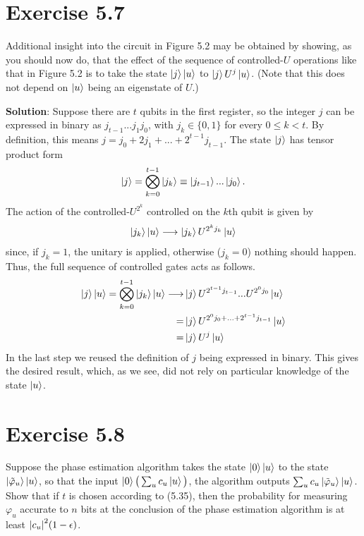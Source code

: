 \documentclass{book}
\begin{document}
\section*{Exercise 5.7}
    Additional insight into the circuit in Figure 5.2 may be obtained by showing, as you should now do, that the effect of the sequence of controlled-$U$ operations like that in Figure 5.2 is to take the state $\ket{j}\ket{u}$ to $\ket{j}U^j\ket{u}$. (Note that this does not depend on $\ket{u}$ being an eigenstate of $U$.)

    \textbf{Solution}: Suppose there are $t$ qubits in the first register, so the integer $j$ can be expressed in binary as $j_{t-1}...j_1j_0$, with $j_k \in \{0,1\}$ for every $0\leq k < t$. By definition, this means $j = j_0 + 2j_1 + ... + 2^{t-1}j_{t-1}$. The state $\ket{j}$ has tensor product form
    \begin{align}
        \ket{j} = \bigotimes_{k=0}^{t-1} \ket{j_k} \equiv \ket{j_{t-1}}...\ket{j_{0}}.
    \end{align}
    The action of the controlled-$U^{2^k}$ controlled on the $k$th qubit is given by
    \begin{align}
        \ket{j_k}\ket{u} \longrightarrow  \ket{j_k} U^{2^k j_k}\ket{u}
    \end{align}
    since, if $j_k = 1$, the unitary is applied, otherwise ($j_k = 0$) nothing should happen. Thus, the full sequence of controlled gates acts as follows.
    \begin{align}
    \begin{aligned}
        \ket{j}\ket{u} = \bigotimes_{k=0}^{t-1} \ket{j_k}\ket{u} \longrightarrow &\ket{j}U^{2^{t-1}j_{t-1}}...U^{2^0 j_0}\ket{u} \\
        = &\ket{j}U^{2^0 j_0 + ... + 2^{t-1} j_{t-1}}\ket{u} \\
        = &\ket{j}U^j\ket{u}
    \end{aligned}
    \end{align}
    In the last step we reused the definition of $j$ being expressed in binary. This gives the desired result, which, as we see, did not rely on particular knowledge of the state $\ket{u}$.

\section*{Exercise 5.8}
    Suppose the phase estimation algorithm takes the state $\ket{0}\ket{u}$ to the state $\ket{\tilde{\varphi}_u}\ket{u}$, so that the input $\ket{0}\big(\sum_u c_u\ket{u}\big)$, the algorithm outputs $\sum_u c_u\ket{\tilde{\varphi}_u}\ket{u}$. Show that if $t$ is chosen according to (5.35), then the probability for measuring $\varphi_u$ accurate to $n$ bits at the conclusion of the phase estimation algorithm is at least $\abs{c_u}^2(1-\epsilon)$.
\end{document}
